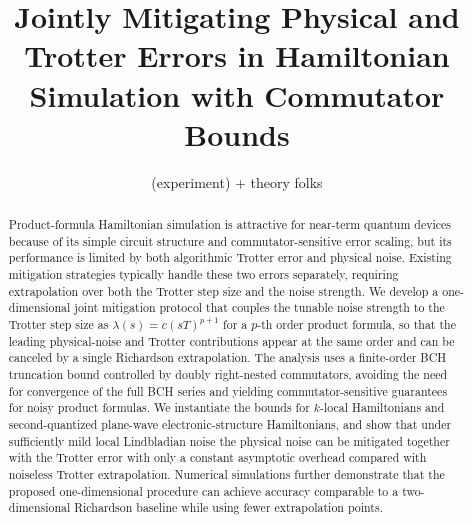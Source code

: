 \documentclass[aps,pra,reprint,groupedaddress,floatfix]{revtex4-2}
\begin{document}
\makeatletter
\long{}
\makeatother

\title{Jointly Mitigating Physical and Trotter Errors in Hamiltonian Simulation with Commutator Bounds}

\author{(experiment) + theory folks}
\date{}

\begin{abstract}
Product-formula Hamiltonian simulation is attractive for near-term quantum devices because of its simple circuit structure and commutator-sensitive error scaling, but its performance is limited by both algorithmic Trotter error and physical noise. Existing mitigation strategies typically handle these two errors separately, requiring extrapolation over both the Trotter step size and the noise strength. We develop a one-dimensional joint mitigation protocol that couples the tunable noise strength to the Trotter step size as $\lambda(s)=c(sT)^{p+1}$ for a $p$-th order product formula, so that the leading physical-noise and Trotter contributions appear at the same order and can be canceled by a single Richardson extrapolation. The analysis uses a finite-order BCH truncation bound controlled by doubly right-nested commutators, avoiding the need for convergence of the full BCH series and yielding commutator-sensitive guarantees for noisy product formulas. We instantiate the bounds for $k$-local Hamiltonians and second-quantized plane-wave electronic-structure Hamiltonians, and show that under sufficiently mild local Lindbladian noise the physical noise can be mitigated together with the Trotter error with only a constant asymptotic overhead compared with noiseless Trotter extrapolation. Numerical simulations further demonstrate that the proposed one-dimensional procedure can achieve accuracy comparable to a two-dimensional Richardson baseline while using fewer extrapolation points.
\end{abstract}

\maketitle
\end{document}
